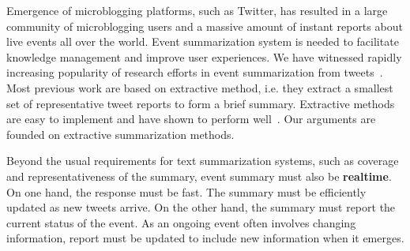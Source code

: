 \documentclass[envcountsame]{llncs}
\begin{document}
Emergence of microblogging platforms, such as Twitter, has resulted in a large community of microblogging users and a massive amount of instant reports about live events all over the world.  Event summarization system is needed to facilitate knowledge management and improve user experiences. We have witnessed rapidly increasing popularity of research efforts in event summarization from tweets~\cite{Takamura2011Summarizing,Lin2012Generating,Rudra2015Extracting,Shou2013Sumblr,Liu2016LEDS,Gillani2017Post,Zubiaga2012Towards,Sharifi2010Summarizing}.   Most previous work are based on extractive method, i.e. they extract a smallest set of representative tweet reports to form a brief summary. Extractive methods are easy to implement and have shown to perform well~\cite{Takamura2011Summarizing,Lin2012Generating,Rudra2015Extracting,Shou2013Sumblr,Liu2016LEDS,Gillani2017Post,Zubiaga2012Towards}. Our arguments are founded on extractive summarization methods.

Beyond the usual requirements for text summarization systems, such as coverage and representativeness of the summary,  event summary must also be \textbf{realtime}. On one hand, the response must be fast. The summary must be efficiently updated as new tweets arrive. On the other hand, the summary must report the current status of the event. As an ongoing event often involves changing information, report must be updated to include new information when it emerges.
\end{document}
